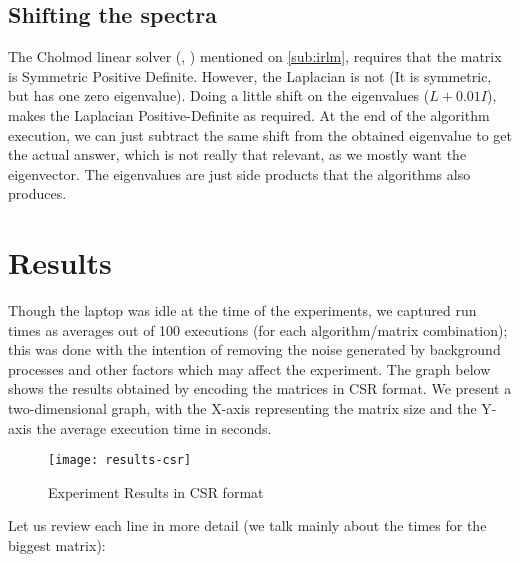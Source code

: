 \subsection{Shifting the spectra}

The \gls{Cholmod} linear solver (\cite{cholmod08},
  \cite{cholmod08a}) mentioned on \cref{sub:irlm}, requires
that the matrix is Symmetric Positive Definite. However, the
\gls{Laplacian} is not (It is symmetric, but has 
one zero eigenvalue). Doing a little shift on the eigenvalues ($L +
0.01I$), makes the \gls{Laplacian} Positive-Definite as required. At the
end of the algorithm execution, we can just subtract the same shift from
the obtained eigenvalue to get the actual answer, which is not really
that relevant, as we mostly want the eigenvector. The eigenvalues are
just side products that the algorithms also produces. 

\section{Results}

Though the laptop was idle at the time of the experiments, we captured
run times as averages out of 100 executions (for each
algorithm/matrix combination); this was done with the intention of
removing the noise generated by background processes and other factors
which may affect the experiment. The graph below shows the results
obtained by encoding the matrices in CSR format. We present a
two-dimensional graph, with the X-axis representing the matrix size
and the Y-axis the average execution time in seconds. 

\begin{figure}[H]
  \centering
  \caption{Experiment Results in CSR format}  
  \texttt{[image: results-csr]}
\end{figure}

Let us review each line in more detail (we talk mainly about the times
for the biggest matrix):

